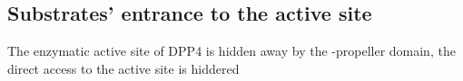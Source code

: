 \subsection{Substrates' entrance to the active site}

The enzymatic active site of DPP4 is hidden away by the \beta-propeller domain, the direct access to the active site is hiddered 